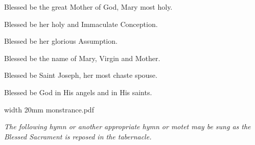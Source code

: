 Blessed be the great Mother of God, Mary most holy.

Blessed be her holy and Immaculate Conception.

Blessed be her glorious Assumption.

Blessed be the name of Mary, Virgin and Mother.

Blessed be Saint Joseph, her most chaste spouse.

Blessed be God in His angels and in His saints.

\bigskip

\saveimageresource width 20mm {monstrance.pdf}

\centerline{\useimageresource \lastsavedimageresourceindex}






\goodbreak
\bigskip
\eject


\medskip

{\noindent \it The following hymn or another appropriate hymn or motet may be sung as the Blessed Sacrament is reposed in the tabernacle.}

\medskip



